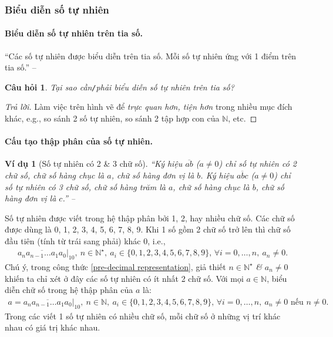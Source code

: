 \documentclass{article}
\numberwithin{equation}{section}
\newtheorem{vidu}{Ví dụ}[section]
\newtheorem{cauhoi}{Câu hỏi}[section]
\begin{document}
\subsubsection{Biểu diễn số tự nhiên}

\paragraph{Biểu diễn số tự nhiên trên tia số.} ``Các số tự nhiên được biểu diễn trên tia số. Mỗi số tự nhiên ứng với 1 điểm trên tia số.'' -- \cite[p. 10]{SGK_Toan_6_Canh_Dieu_tap_1}

\begin{cauhoi}
	Tại sao cần\emph{\texttt{/}}phải biểu diễn số tự nhiên trên tia số?
\end{cauhoi}

\begin{proof}[Trả lời]
	Làm việc trên hình vẽ để \textit{trực quan hơn, tiện hơn} trong nhiều mục đích khác, e.g., so sánh 2 số tự nhiên, so sánh 2 tập hợp con của $\mathbb{N}$, etc.
\end{proof}

\paragraph{Cấu tạo thập phân của số tự nhiên.}
\begin{vidu}[Số tự nhiên có 2 \& 3 chữ số]
	``Ký hiệu $\overline{ab}$ ($a\ne 0$) chỉ số tự nhiên có 2 chữ số, chữ số hàng chục là $a$, chữ số hàng đơn vị là $b$. Ký hiệu $\overline{abc}$ ($a\ne 0$) chỉ số tự nhiên có 3 chữ số, chữ số hàng trăm là $a$, chữ số hàng chục là $b$, chữ số hàng đơn vị là $c$.'' -- \cite[p. 10]{SGK_Toan_6_Canh_Dieu_tap_1}
\end{vidu}


Số tự nhiên được viết trong hệ thập phân bởi 1, 2, hay nhiều chữ số. Các chữ số được dùng là 0, 1, 2, 3, 4, 5, 6, 7, 8, 9. Khi 1 số gồm 2 chữ số trở lên thì chữ số đầu tiên (tính từ trái sang phải) khác 0, i.e.,
\begin{align}
	\label{pre-decimal representation}
	\overline{a_na_{n-1}\ldots a_1a_0}|_{10},\ n\in\mathbb{N}^\star,\ a_i\in\{0,1,2,3,4,5,6,7,8,9\},\,\forall i = 0,\ldots,n,\ a_n\ne 0.
\end{align}
Chú ý, trong công thức \eqref{pre-decimal representation}, giả thiết $n\in\mathbb{N}^\star$ \textit{\&} $a_n\ne 0$ khiến ta chỉ xét ở đây các số tự nhiên có ít nhất 2 chữ số. Với mọi $a\in\mathbb{N}$, biểu diễn chữ số trong hệ thập phân của $a$ là:
\begin{align}
	\label{decimal representation}
	a = \overline{a_na_{n-1}\ldots a_1a_0}|_{10},\ n\in\mathbb{N},\ a_i\in\{0,1,2,3,4,5,6,7,8,9\},\,\forall i = 0,\ldots,n,\ a_n\ne 0\mbox{ nếu } n\ne 0.
\end{align}
Trong các viết 1 số tự nhiên có nhiều chữ số, mỗi chữ số ở những vị trí khác nhau có giá trị khác nhau.
\end{document}
